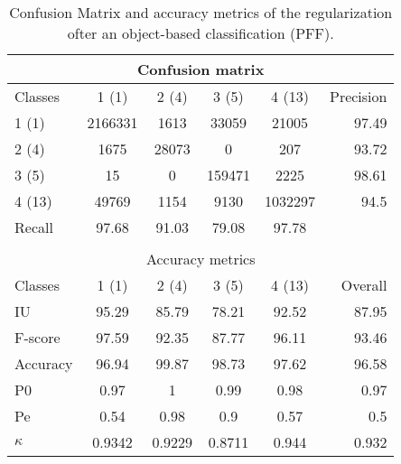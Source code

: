 \begin{table}[H]
\begin{center}
\footnotesize
\begin{tabular}{|l|c|c|c|c|r|}
\hline
\multicolumn{6}{|c|}{Confusion matrix} \\
\hline
 Classes & 1 (1) & 2 (4) & 3 (5) & 4 (13) & Precision \\
\hline
1 (1) & 2166331 & 1613 & 33059 & 21005 & 97.49 \\
\hline
2 (4) & 1675 & 28073 & 0 & 207 & 93.72 \\
\hline
3 (5) & 15 & 0 & 159471 & 2225 & 98.61 \\
\hline
4 (13) & 49769 & 1154 & 9130 & 1032297 & 94.5 \\
\hline
Recall & 97.68 & 91.03 & 79.08 & 97.78 &  \\
\hline
\multicolumn{6}{c}{ } \\
\hline
\multicolumn{6}{|c|}{Accuracy metrics} \\
\hline
 Classes & 1 (1) & 2 (4) & 3 (5) & 4 (13) & Overall \\
\hline
IU & 95.29 & 85.79 & 78.21 & 92.52 & 87.95 \\
\hline
F-score & 97.59 & 92.35 & 87.77 & 96.11 & 93.46 \\
\hline
Accuracy & 96.94 & 99.87 & 98.73 & 97.62 & 96.58 \\
\hline
P0 & 0.97 & 1 & 0.99 & 0.98 & 0.97 \\
\hline
Pe & 0.54 & 0.98 & 0.9 & 0.57 & 0.5 \\
\hline
$\kappa$ & 0.9342 & 0.9229 & 0.8711 & 0.944 & 0.932 \\
\hline
\end{tabular}
\caption{Confusion Matrix and accuracy metrics of the regularization ofter an object-based classification (PFF).}
\label{table:C3_S3_ss3_regul_PFF}
\end{center}
\end{table}